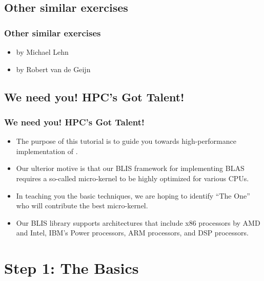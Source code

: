 \documentclass[xcolor=pdflatex,dvipsnames,table]{beamer}
\begin{document}
\subsection{Other similar exercises}
\begin{frame}[fragile]
\frametitle{Other similar exercises}
\begin{itemize}

\item {} by Michael Lehn
\item {} by Robert van de Geijn
\end{itemize}

\end{frame}

\subsection{We need you! HPC's Got Talent!}
\begin{frame}[fragile]
\frametitle{We need you! HPC's Got Talent!}

\begin{itemize}
\item The purpose of this tutorial is to guide you towards high-performance
implementation of \Gemm.

\item Our ulterior motive is that our BLIS framework for implementing BLAS requires a so-called micro-kernel to be highly optimized for various CPUs.

\item In teaching you the basic techniques, we are hoping to identify  ``The One'' who will contribute the best micro-kernel.

\item Our BLIS library supports architectures that include x86 processors by AMD and Intel, IBM's Power processors, ARM processors, and DSP processors.
\end{itemize}

\end{frame}

\section{Step 1: The Basics}
\end{document}
